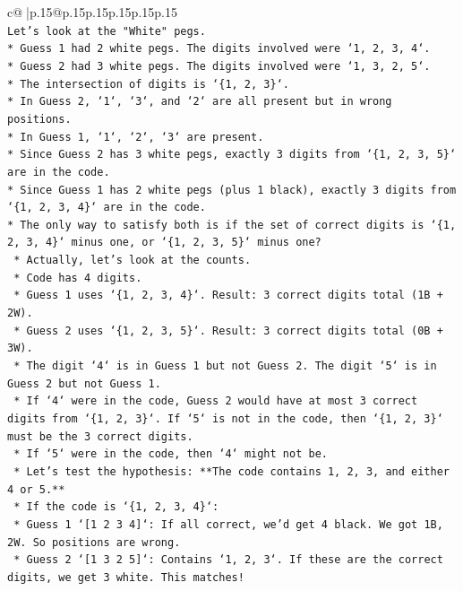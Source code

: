\documentclass{article}
\begin{document}
{\begin{supertabular}{c@{$\;$}|p{.15\linewidth}@{}p{.15\linewidth}p{.15\linewidth}p{.15\linewidth}p{.15\linewidth}p{.15\linewidth}}
{{{\\ 
\texttt{Let's look at the "White" pegs.} \\
\texttt{*   Guess 1 had 2 white pegs. The digits involved were `1, 2, 3, 4`.} \\
\texttt{*   Guess 2 had 3 white pegs. The digits involved were `1, 3, 2, 5`.} \\
\texttt{*   The intersection of digits is `\{1, 2, 3\}`.} \\
\texttt{*   In Guess 2, `1`, `3`, and `2` are all present but in wrong positions.} \\
\texttt{*   In Guess 1, `1`, `2`, `3` are present.} \\
\texttt{*   Since Guess 2 has 3 white pegs, exactly 3 digits from `\{1, 2, 3, 5\}` are in the code.} \\
\texttt{*   Since Guess 1 has 2 white pegs (plus 1 black), exactly 3 digits from `\{1, 2, 3, 4\}` are in the code.} \\
\texttt{*   The only way to satisfy both is if the set of correct digits is `\{1, 2, 3, 4\}` minus one, or `\{1, 2, 3, 5\}` minus one?} \\
\texttt{    *   Actually, let's look at the counts.} \\
\texttt{    *   Code has 4 digits.} \\
\texttt{    *   Guess 1 uses `\{1, 2, 3, 4\}`. Result: 3 correct digits total (1B + 2W).} \\
\texttt{    *   Guess 2 uses `\{1, 2, 3, 5\}`. Result: 3 correct digits total (0B + 3W).} \\
\texttt{    *   The digit `4` is in Guess 1 but not Guess 2. The digit `5` is in Guess 2 but not Guess 1.} \\
\texttt{    *   If `4` were in the code, Guess 2 would have at most 3 correct digits from `\{1, 2, 3\}`. If `5` is not in the code, then `\{1, 2, 3\}` must be the 3 correct digits.} \\
\texttt{    *   If `5` were in the code, then `4` might not be.} \\
\texttt{    *   Let's test the hypothesis: **The code contains 1, 2, 3, and either 4 or 5.**} \\
\texttt{    *   If the code is `\{1, 2, 3, 4\}`:} \\
\texttt{        *   Guess 1 `{[}1 2 3 4{]}`: If all correct, we'd get 4 black. We got 1B, 2W. So positions are wrong.} \\
\texttt{        *   Guess 2 `{[}1 3 2 5{]}`: Contains `1, 2, 3`. If these are the correct digits, we get 3 white. This matches!} \\
}}}
\end{supertabular}}
\end{document}
